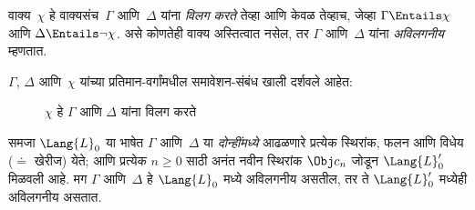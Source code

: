 \begin{defn}
वाक्य~$\chi$ हे वाक्यसंच~$\Gamma$ आणि~$\Delta$ यांना \emph{विलग करते}
तेव्हा आणि केवळ तेव्हाच, जेव्हा $\Gamma \Entails \chi$ आणि $\Delta
\Entails \lnot \chi$. असे कोणतेही वाक्य अस्तित्वात नसेल, तर
$\Gamma$ आणि~$\Delta$ यांना \emph{अविलगनीय} म्हणतात.
\end{defn}

$\Gamma$, $\Delta$ आणि~$\chi$ यांच्या प्रतिमान-वर्गांमधील समावेशन-संबंध
खाली दर्शवले आहेत:
\begin{figure}[h]
  \centering
  \caption{$\chi$ हे $\Gamma$ आणि $\Delta$ यांना विलग करते}
  \label{mod:int:sep:fig:sep}
\end{figure}


\begin{lem}\label{mod:int:sep:lem:sep1}
समजा $\Lang{L}_0$ या भाषेत $\Gamma$ आणि~$\Delta$ या \emph{दोन्हींमध्ये}
आढळणारे प्रत्येक स्थिरांक, फलन आणि विधेय ($\doteq$
खेरीज) येते; आणि प्रत्येक $n \ge 0$ साठी अनंत नवीन स्थिरांक
$\Obj c_n$ जोडून $\Lang{L}'_0$ मिळवली आहे. मग $\Gamma$ आणि~$\Delta$ हे
$\Lang{L}_0$ मध्ये अविलगनीय असतील, तर ते $\Lang{L}'_0$ मध्येही अविलगनीय
असतात.
\end{lem}

